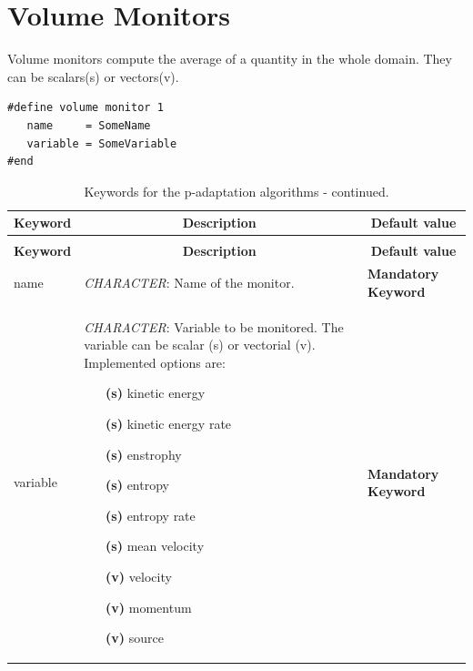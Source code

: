 \documentclass[a4paper,10pt]{report}
\begin{document}
\section{Volume Monitors}
Volume monitors compute the average of a quantity in the whole domain. They can be scalars(s) or vectors(v). 

\begin{lstlisting}
#define volume monitor 1
   name     = SomeName
   variable = SomeVariable
#end
\end{lstlisting}

\begin{longtable}{|p{4cm}|p{10cm}|p{2.2cm}|}
\caption{Keywords for volume monitors.} \label{tab:VolMonitorsKey} \\
\hline
\multicolumn{1}{|c|}{\textbf{Keyword}} & \multicolumn{1}{c|}{\textbf{Description}} & \multicolumn{1}{c|}{\textbf{Default value}} \\ \hline
\endfirsthead

\caption{Keywords for the p-adaptation algorithms - continued.} \\
\hline
\multicolumn{1}{|c|}{\textbf{Keyword}} & \multicolumn{1}{c|}{\textbf{Description}} & \multicolumn{1}{c|}{\textbf{Default value}} \\ \hline
\endhead

name 	& 
			\textit{CHARACTER}: Name of the monitor. & 
							\textbf{Mandatory Keyword} \\ \hline

variable 	& 
			\textit{CHARACTER}: Variable to be monitored. The variable can be scalar (s) or vectorial (v). Implemented options are:\
\begin{multicols}{2}
\begin{itemize}
\item[\textbf{(s)}] kinetic energy
\item[\textbf{(s)}] kinetic energy rate
\item[\textbf{(s)}] enstrophy
\item[\textbf{(s)}] entropy
\item[\textbf{(s)}] entropy rate
\item[\textbf{(s)}] mean velocity
\item[\textbf{(v)}] velocity
\item[\textbf{(v)}] momentum
\item[\textbf{(v)}] source
\end{itemize}		
\end{multicols}	
			
			 & 
							\textbf{Mandatory Keyword} \\ \hline


\end{longtable}
\end{document}
